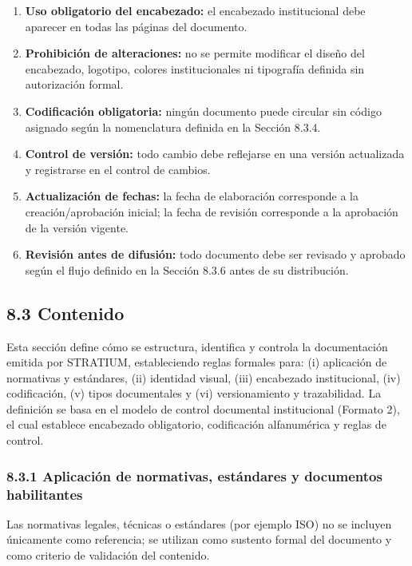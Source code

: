 \documentclass{encabezado}
\begin{document}
\begin{enumerate}
    \item \textbf{Uso obligatorio del encabezado:} el encabezado institucional debe aparecer en todas las páginas del documento.
    \item \textbf{Prohibición de alteraciones:} no se permite modificar el diseño del encabezado, logotipo, colores institucionales ni tipografía definida sin autorización formal.
    \item \textbf{Codificación obligatoria:} ningún documento puede circular sin código asignado según la nomenclatura definida en la Sección 8.3.4.
    \item \textbf{Control de versión:} todo cambio debe reflejarse en una versión actualizada y registrarse en el control de cambios.
    \item \textbf{Actualización de fechas:} la fecha de elaboración corresponde a la creación/aprobación inicial; la fecha de revisión corresponde a la aprobación de la versión vigente.
    \item \textbf{Revisión antes de difusión:} todo documento debe ser revisado y aprobado según el flujo definido en la Sección 8.3.6 antes de su distribución.
\end{enumerate}

\subsection*{8.3 Contenido}

Esta sección define cómo se estructura, identifica y controla la documentación emitida por STRATIUM, estableciendo reglas formales para: (i) aplicación de normativas y estándares, (ii) identidad visual, (iii) encabezado institucional, (iv) codificación, (v) tipos documentales y (vi) versionamiento y trazabilidad. La definición se basa en el modelo de control documental institucional (Formato 2), el cual establece encabezado obligatorio, codificación alfanumérica y reglas de control.

\subsubsection*{8.3.1 Aplicación de normativas, estándares y documentos habilitantes}

Las normativas legales, técnicas o estándares (por ejemplo ISO) no se incluyen únicamente como referencia; se utilizan como sustento formal del documento y como criterio de validación del contenido.
\end{document}
